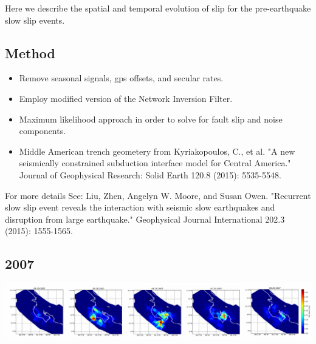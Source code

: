 \documentclass[a0,landscape]{a0poster}
\begin{document}
\begin{multicols}{5}
Here we describe the spatial and temporal evolution of slip for the pre-earthquake slow slip events. 
\subsection*{Method}
\begin{itemize}
\item Remove seasonal signals, gps offsets, and secular rates.
\item Employ modified version of the Network Inversion Filter.
\item Maximum likelihood approach in order to solve for  fault slip and noise components. 
\item Middle American trench geometery from Kyriakopoulos, C., et al. "A new seismically constrained subduction interface model for Central America." Journal of Geophysical Research: Solid Earth 120.8 (2015): 5535-5548.
\end{itemize}
\begin{footnotesize}
For more details See: Liu, Zhen, Angelyn W. Moore, and Susan Owen. "Recurrent slow slip event reveals the interaction with seismic slow earthquakes and disruption from large earthquake." Geophysical Journal International 202.3 (2015): 1555-1565.  
\end{footnotesize}

\subsection*{2007}
\begin{center}\vspace{0.2cm}
	\includegraphics[width=30cm]{2007.pdf}
\end{center}\vspace{0.2cm}


\end{multicols}
\end{document}

